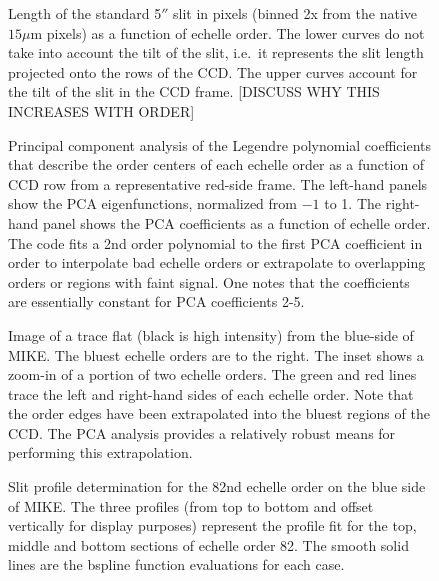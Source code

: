 \documentclass[12pt,preprint]{aastex}
\begin{document}
\begin{figure}
\caption{Length of the standard 5$''$ slit in pixels (binned 2x from the
native $15\mu$m pixels) as a function of echelle order.  The lower curves do
not take into account the tilt of the slit, i.e.\ it represents the slit
length projected onto the rows of the CCD.  The upper curves account
for the tilt of the slit in the CCD frame. 
[DISCUSS WHY THIS INCREASES WITH ORDER]}
\label{fig:slitlen}
\end{figure}

\begin{figure}
\caption{Principal component analysis of the Legendre polynomial coefficients
that describe the order centers of each echelle order as a function of CCD row
from a representative red-side frame.  The left-hand panels show the
PCA eigenfunctions, normalized from $-1$ to 1.  The right-hand panel
shows the PCA coefficients as a function of echelle order.  The code
fits a 2nd order polynomial to the first PCA coefficient in order to
interpolate bad echelle orders or extrapolate to overlapping orders or
regions with faint signal.  One notes that the coefficients are essentially
constant for PCA coefficients 2-5.
}
\label{fig:pca}
\end{figure}

\begin{figure}
\caption{Image of a trace flat (black is high intensity) from the blue-side
of MIKE.  The bluest echelle orders are to the right.  The inset shows
a zoom-in of a portion of two echelle orders.  The green and red lines
trace the left and right-hand sides of each echelle order.  Note that
the order edges have been extrapolated into the bluest regions of the
CCD.  The PCA analysis provides a relatively robust means for performing
this extrapolation.}
\label{fig:trace}
\end{figure}

\begin{figure}
\caption{Slit profile determination for the 82nd echelle order on the blue side
of MIKE.  The three profiles (from top to bottom and offset 
vertically for display purposes) represent 
the profile fit for the top, middle and bottom sections of echelle order 82.  
The smooth solid lines are the bspline function evaluations for
each case. 
}
\label{fig:slitflat}
\end{figure}
\end{document}
